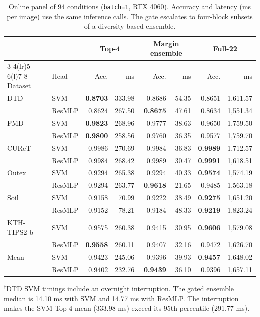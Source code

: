 \documentclass[10pt,a4paper,fleqn]{article}
\begin{document}
\begin{table}[htbp]
\centering
\caption{Online panel of 94 conditions (\texttt{batch=1}, RTX 4060). Accuracy and latency (ms per image) use the same inference calls. The gate escalates to four-block subsets of a diversity-based ensemble.}
\label{tab:panel}
\setlength{\tabcolsep}{2.5pt}
\begin{tabular}{@{}llrrrrrr@{}}
\toprule
 & & \multicolumn{2}{c}{Top-4} & \multicolumn{2}{c}{Margin ensemble} & \multicolumn{2}{c}{Full-22} \\
\cmidrule(lr){3-4}\cmidrule(lr){5-6}\cmidrule(l){7-8}
Dataset & Head & Acc. & ms & Acc. & ms & Acc. & ms \\
\midrule
DTD$^{\dagger}$ & SVM & \textbf{0.8703} & 333.98 & 0.8686 & 54.35 & 0.8651 & 1,611.57 \\
 & ResMLP & 0.8624 & 267.50 & \textbf{0.8675} & 47.61 & 0.8634 & 1,551.34 \\
FMD & SVM & \textbf{0.9823} & 268.96 & 0.9777 & 38.63 & 0.9650 & 1,759.50 \\
 & ResMLP & \textbf{0.9800} & 258.56 & 0.9760 & 36.35 & 0.9577 & 1,759.70 \\
CUReT & SVM & 0.9986 & 270.69 & 0.9984 & 36.83 & \textbf{0.9989} & 1,712.57 \\
 & ResMLP & 0.9984 & 268.42 & 0.9989 & 30.47 & \textbf{0.9991} & 1,618.51 \\
Outex & SVM & 0.9294 & 265.38 & 0.9294 & 40.33 & \textbf{0.9574} & 1,574.19 \\
 & ResMLP & 0.9294 & 263.77 & \textbf{0.9618} & 21.65 & 0.9485 & 1,563.18 \\
Soil & SVM & 0.9158 & 70.99 & 0.9222 & 38.49 & \textbf{0.9275} & 1,651.20 \\
 & ResMLP & 0.9152 & 78.21 & 0.9184 & 48.33 & \textbf{0.9219} & 1,823.24 \\
KTH-TIPS2-b & SVM & 0.9575 & 260.38 & 0.9415 & 30.95 & \textbf{0.9606} & 1,579.08 \\
 & ResMLP & \textbf{0.9558} & 260.11 & 0.9407 & 32.16 & 0.9472 & 1,626.70 \\
\midrule
Mean & SVM & 0.9423 & 245.06 & 0.9396 & 39.93 & \textbf{0.9457} & 1,648.02 \\
 & ResMLP & 0.9402 & 232.76 & \textbf{0.9439} & 36.10 & 0.9396 & 1,657.11 \\
\bottomrule
\end{tabular}

\vspace{0.35em}
\begin{minipage}{0.98\textwidth}\footnotesize
$^{\dagger}$DTD SVM timings include an overnight interruption. The gated ensemble median is 14.10 ms with SVM and 14.77 ms with ResMLP. The interruption makes the SVM Top-4 mean (333.98 ms) exceed its 95th percentile (291.77 ms).
\end{minipage}
\end{table}
\end{document}
